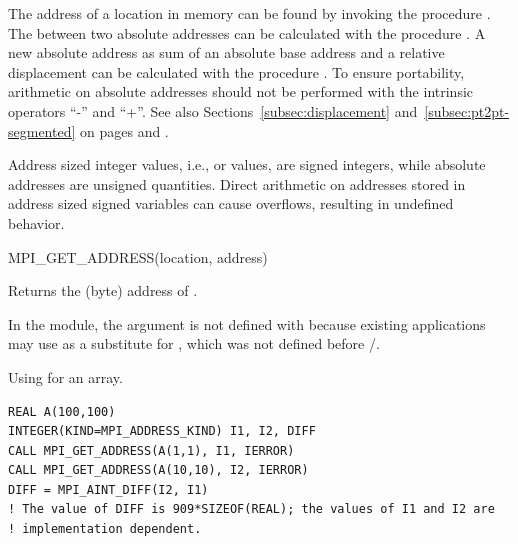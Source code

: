 The address of a location in memory can be found by invoking the
procedure\flushline
{}.
The 
between two absolute addresses
can be calculated with the procedure . A new absolute
address as sum of an absolute base address and a relative displacement can be
calculated with the procedure . To ensure portability,
arithmetic on absolute addresses should not be performed with the intrinsic
operators ``-'' and ``+''. See also Sections~\ref{subsec:displacement}
and~\ref{subsec:pt2pt-segmented} on pages \pageref{subsec:displacement} and
\pageref{subsec:pt2pt-segmented}.

\begin{rationale}
Address sized integer values, i.e.,  or
\vlgb{} values, are signed integers, while
absolute addresses are unsigned quantities. Direct arithmetic on addresses
stored in address sized signed variables can cause overflows, resulting in
undefined behavior.
\end{rationale}

%
\begin{funcdef}{MPI\_GET\_ADDRESS}{(\mbox{location}, \mbox{address})}
\end{funcdef}

Returns the (byte) address of .

\begin{rationale}
In the  module, the  argument is not defined
with  because existing applications may use
 as a
substitute for , which was not defined before \MPIIIIDOTO/.
\end{rationale}

\begin{example}
\label{pt2pt-exW}
%
Using  for an array.

\begin{lstlisting}[language={[MPI]Fortran}]
REAL A(100,100)
INTEGER(KIND=MPI_ADDRESS_KIND) I1, I2, DIFF
CALL MPI_GET_ADDRESS(A(1,1), I1, IERROR)
CALL MPI_GET_ADDRESS(A(10,10), I2, IERROR)
DIFF = MPI_AINT_DIFF(I2, I1)
! The value of DIFF is 909*SIZEOF(REAL); the values of I1 and I2 are
! implementation dependent.
\end{lstlisting}
\end{example}

